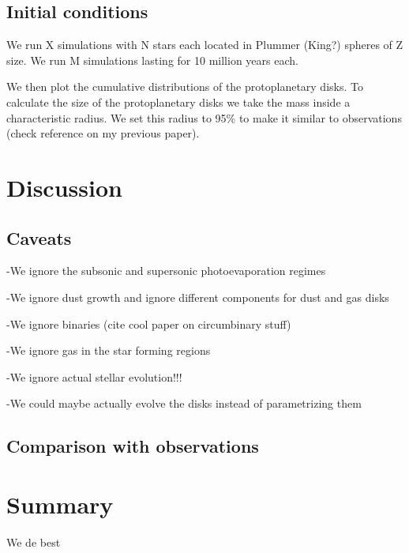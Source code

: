 \documentclass[fleqn,usenatbib]{mnras}
\begin{document}
\subsection{Initial conditions}
We run X simulations with N stars each located in Plummer (King?) spheres of Z size. We run M simulations lasting for 10 million years each. 

We then plot the cumulative distributions of the protoplanetary disks. To calculate the size of the protoplanetary disks we take the mass inside a characteristic radius. We set this radius to 95\% to make it similar to observations (check reference on my previous paper).

\section{Discussion}
\label{sec:discussion}

\subsection{Caveats}
-We ignore the subsonic and supersonic photoevaporation regimes 

-We ignore dust growth and ignore different components for dust and gas disks 

-We ignore binaries (cite cool paper on circumbinary stuff)

-We ignore gas in the star forming regions

-We ignore actual stellar evolution!!!

-We could maybe actually evolve the disks instead of parametrizing them

\subsection{Comparison with observations}

\section{Summary}
\label{sec:summary}

We de best

\bsp	%


\label{lastpage}
\end{document}
